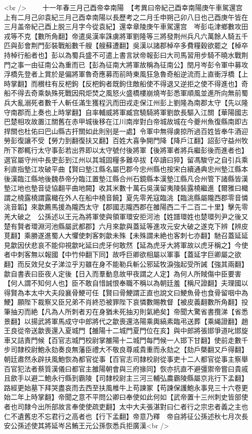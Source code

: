 <br />
　　十一年春三月己酉帝幸南陽　【考異曰帝紀己酉幸南陽庚午車駕還宫上有二月己卯袁紀三月己酉幸南陽以長歷考之二月壬申朔己卯八日也己酉庚午皆在三月盖帝紀己酉上脱三月字今從袁紀】還幸章陵庚午車駕還宫　岑彭屯津鄉數攻田戎等不克【數所角翻】帝遣吳漢率誅虜將軍劉隆等三將發荆州兵凡六萬餘人騎五千匹與彭會荆門彭裝戰船數千艘【艘蘇遭翻】吳漢以諸郡棹卒多費糧穀欲罷之【棹卒持棹行船者也】彭以為蜀兵盛不可遣上書言狀帝報彭曰大司馬習用步騎不曉水戰荆門之事一由征南公為重而已【彭為征南大將軍故稱為征南公】閏月岑彭令軍中募攻浮橋先登者上賞於是偏將軍魯奇應募而前時東風狂急魯奇船逆流而上直衝浮橋【上時掌翻】而櫕柱有反杷鉤【反杷鉤者既鉤住敵船使不得退又逆拒之使不得進也】奇船不得去奇乘埶殊死戰因飛炬焚之風怒火盛橋樓崩燒岑彭悉軍順風並進所向無前蜀兵大亂溺死者數千人斬任滿生獲程汎而田戎走保江州彭上劉隆為南郡太守【先以隆守南郡而上奏也上時掌翻】自率輔威將軍臧宫驍騎將軍劉歆長驅入江關【華陽國志巴楚相攻故置江關舊在赤甲城後移在江川南岸對白帝城故城在今夔州魚復縣南即古捍關也杜佑曰巴山縣古扞關如此則别是一處】令軍中無得虜掠所過百姓皆奉牛酒迎勞彭復讓不受【勞力到翻復扶又翻】百姓大喜争開門降【降戶江翻】詔彭守益州牧所下郡輒行太守事彭若出界即以太守號付後將軍【後將軍者將兵繼彭後而進者也】選官屬守州中長吏彭到江州以其城固糧多難卒拔【卒讀曰猝】留馮駿守之自引兵乘利直指墊江攻破平曲【賢曰墊江縣名屬巴郡今忠州縣也按宋白續通典忠州墊江縣本後漢臨江縣地後魏恭帝分臨江置墊江縣合州石鏡縣本漢墊江縣凡合州管下諸縣皆漢墊江地也墊音徒協翻平曲地闕】收其米數十萬石吳漢留夷陵裝露橈繼進【爾雅曰檝謂之橈露橈謂露檝在外人在船中橈音饒】夏先零羌寇臨洮【臨洮縣屬隴西郡零音憐洮音韜】來歙薦馬援為隴西太守【郡國志隴西郡在雒陽西二千二百二十里】擊先零羌大破之　公孫述以王元為將軍使與領軍環安拒河池【姓譜環姓也楚環列尹之後又楚有賢者環淵河池縣屬武都郡】六月來歙與蓋延等進攻元安大破之遂克下辨【辨皮莧翻】乘勝遂進蜀人大懼使刺客刺歙未殊【未殊謂未絶也客刺七亦翻】馳召蓋延延見歙因伏悲哀不能仰視歙叱延曰虎牙何敢然【延為虎牙大將軍故以虎牙稱之】今使者中刺客無以報國【中竹仲翻下同】故呼巨卿欲相屬以軍事【蓋延字巨卿屬之欲翻】而反效兒女子涕泣乎刃雖在身不能勒兵斬公邪延牧淚強起受所誡【強其兩翻】歙自書表曰臣夜人定後【日入而羣動息故甲夜謂之人定】為何人所賊傷中臣要害【何人謂不知何人也】臣不敢自惜誠恨奉職不稱以為朝廷羞【稱尺證翻】夫理國以得賢為本太中大夫段襄骨鯁可任【賢曰骨鯁謂正直也說文曰鯁魚骨也食骨留咽中為鯁】願陛下裁察又臣兄弟不肖終恐被罪陛下哀憐數賜教督【被皮義翻數所角翻】投筆抽刃而絶【凡為人所刺者刃在身猶未死抽刃則氣絶矣】帝聞大驚省書攬涕【省悉景翻】以揚武將軍馬成守中郎將代之歙喪還洛陽乘輿縞素臨弔送葬【乘䋲證翻】趙王良從帝送歙喪還入夏城門【雒陽十二城門夏門位在亥】與中郎將張邯爭道叱邯旋車又詰責門候【百官志城門校尉掌雒陽十二城門每門候一人邯下甘翻】使前走數千步司隸校尉鮑永劾奏良無藩臣禮大不敬良尊戚貴重而永劾之【劾戶槩翻又戶得翻】朝廷肅然永辟扶風鮑恢為都官從事【百官志司隸校尉從事吏十二人都官從事主察舉百官犯法者蔡質漢儀曰都官主雒陽朝會與三府掾同】恢亦抗直不避彊禦帝嘗曰貴戚且歛手以避二鮑永行縣到霸陵【司隸校尉主三河三輔弘農霸陵縣屬京兆行下孟翻】路經更始墓下拜哭盡哀而去西至扶風椎牛上苟諫冢【苟諫保護鮑永事見三十六卷更始二年上時掌翻】帝聞之意不平問公卿曰奉使如此何如【武帝置十三州刺史皆部使者也司隸今出所部故言奉使使疏吏翻】太中大夫張湛對曰仁者行之宗忠者義之主也仁不遺舊忠不忘君行之高者也【行下孟翻】帝意乃釋　帝自將征公孫述秋七月次長安公孫述使其將延岑呂鮪王元公孫恢悉兵拒廣漢<br />
